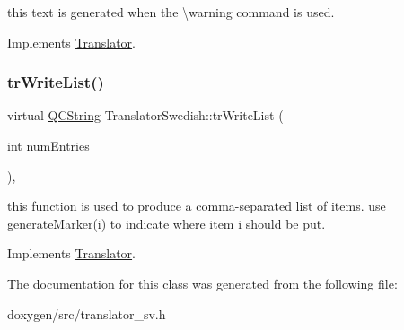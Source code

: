 this text is generated when the \textbackslash{}warning command is used. 

Implements \mbox{\hyperlink{class_translator}{Translator}}.

\mbox{\label{class_translator_swedish_af64d122e4a2911cb572c601f8b84cb38}} 
\subsubsection{\texorpdfstring{trWriteList()}{trWriteList()}}
{\footnotesize\ttfamily virtual \mbox{\hyperlink{class_q_c_string}{Q\+C\+String}} Translator\+Swedish\+::tr\+Write\+List (\begin{DoxyParamCaption}\item[{int}]{num\+Entries }\end{DoxyParamCaption})\hspace{0.3cm}{\ttfamily [inline]}, {\ttfamily [virtual]}}

this function is used to produce a comma-\/separated list of items. use generate\+Marker(i) to indicate where item i should be put. 

Implements \mbox{\hyperlink{class_translator}{Translator}}.



The documentation for this class was generated from the following file\+:\begin{DoxyCompactItemize}
\item 
doxygen/src/translator\+\_\+sv.\+h\end{DoxyCompactItemize}
